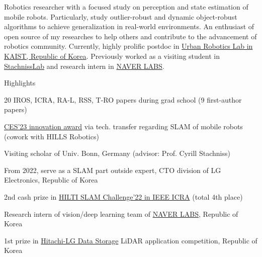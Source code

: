 

\begin{cvparagraph}

Robotics researcher with a focused study on perception and state estimation of mobile robots.
Particularly, study outlier-robust and dynamic object-robust algorithms to achieve generalization in real-world environments.
An enthusiast of open source of my researches to help others and contribute to the advancement of robotics community.
Currently, highly prolific postdoc in \href{https://urobot.kaist.ac.kr/}{Urban Robotics Lab in KAIST, Republic of Korea}.
Previously worked as a visiting student in \href{https://www.ipb.uni-bonn.de/}{StachnissLab} and research intern in \href{https://www.naverlabs.com/}{NAVER LABS}.

\newcommand{\lineintv}{\vspace{0.1cm}}

\cventry
  {} %
  {Highlights\vspace{-0.3cm}} %
  {} %
  {} %
  {
    \begin{cvitems} %
      \item {20 IROS, ICRA, RA-L, RSS, T-RO papers during grad school (9 first-author papers)\lineintv}
      \item {\href{https://www.ces.tech/innovation-awards/honorees/2023/honorees/h/hi-bot-hologram-image-guide-robot.aspx}{CES'23 innovation award} via tech. transfer regarding SLAM of mobile robots (cowork with HILLS Robotics)\lineintv}
      \item {Visiting scholar of Univ. Bonn, Germany (advisor: Prof. Cyrill Stachniss)\lineintv}
      \item {From 2022, serve as a SLAM part outside expert, CTO division of LG Electronics, Republic of Korea\lineintv}
      \item {2nd cash prize in \href{https://hilti-challenge.com/}{HILTI SLAM Challenge'22 in IEEE ICRA} (total 4th place)\lineintv}
      \item {Research intern of vision/deep learning team of \href{https://www.naverlabs.com/}{NAVER LABS}, Republic of Korea\lineintv}
      \item {1st prize in \href{https://hitachi-lg.com/}{Hitachi-LG Data Storage} LiDAR application competition, Republic of Korea\lineintv}
    \end{cvitems}
  }



\end{cvparagraph}
